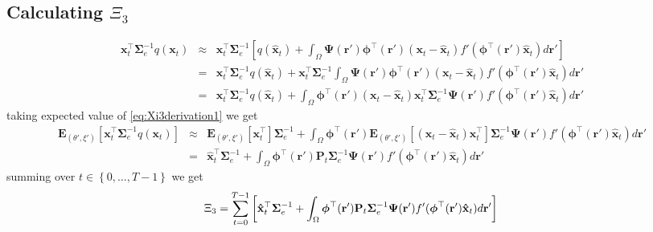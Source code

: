 \documentclass[]{article}
\begin{document}
\subsection*{Calculating $\Xi_3$}
\begin{eqnarray}\label{eq:Xi3derivation1}
 \mathbf x_t^\top\boldsymbol\Sigma_e^{-1}q(\mathbf x_t)&\approx&\mathbf x_t^\top\boldsymbol\Sigma_e^{-1}\left[q(\mathbf {\hat x}_t)+\int_\Omega \boldsymbol{\Psi}(\mathbf{r}')\boldsymbol \phi^\top(\mathbf r') (\mathbf x_t - \mathbf  {\hat x}_t)f'(\boldsymbol \phi^\top(\mathbf r')\mathbf {\hat x}_t) d\mathbf{r}'\right] \nonumber\\
&=&\mathbf x_t^\top\boldsymbol\Sigma_e^{-1}q(\mathbf {\hat x}_t)+\mathbf x_t^\top\boldsymbol\Sigma_e^{-1}\int_\Omega \boldsymbol{\Psi}(\mathbf{r}')\boldsymbol \phi^\top(\mathbf r') (\mathbf x_t - \mathbf  {\hat x}_t)f'(\boldsymbol \phi^\top(\mathbf r')\mathbf {\hat x}_t) d\mathbf{r}' \nonumber \\
&=&\mathbf x_t^\top\boldsymbol\Sigma_e^{-1}q(\mathbf {\hat x}_t)+\int_\Omega \boldsymbol \phi^\top(\mathbf r') (\mathbf x_t - \mathbf  {\hat x}_t)\mathbf x_t^\top\boldsymbol\Sigma_e^{-1}\boldsymbol{\Psi}(\mathbf{r}')f'(\boldsymbol \phi^\top(\mathbf r')\mathbf {\hat x}_t) d\mathbf{r}'
\end{eqnarray}
taking expected value of \ref{eq:Xi3derivation1} we get
\begin{eqnarray}\label{eq:Xi3derivation2}
\mathbf E_{(\theta',\xi')}\left[\mathbf x_t^\top\boldsymbol\Sigma_e^{-1}q(\mathbf x_t)\right]&\approx&\mathbf E_{(\theta',\xi')}\left[\mathbf x_t^\top\right]\boldsymbol\Sigma_e^{-1}+\int_\Omega \boldsymbol \phi^\top(\mathbf r') \mathbf E_{(\theta',\xi')}\left[(\mathbf x_t - \mathbf  {\hat x}_t)\mathbf x_t^\top\right]\boldsymbol\Sigma_e^{-1}\boldsymbol{\Psi}(\mathbf{r}')f'(\boldsymbol \phi^\top(\mathbf r')\mathbf {\hat x}_t) d\mathbf{r}' \nonumber \\
&=&\mathbf{ \hat x}_t^\top\boldsymbol\Sigma_e^{-1}+\int_\Omega \boldsymbol \phi^\top(\mathbf r') \mathbf P_t\boldsymbol\Sigma_e^{-1}\boldsymbol{\Psi}(\mathbf{r}')f'(\boldsymbol \phi^\top(\mathbf r')\mathbf {\hat x}_t) d\mathbf{r}'
\end{eqnarray}
summing over $t \in \left\lbrace 0, \dots, T-1\right\rbrace $ we get
\begin{equation}
\Xi_3=\sum_{t=0}^{T-1}\left[\mathbf{ \hat x}_t^\top\boldsymbol\Sigma_e^{-1}+\int_\Omega \boldsymbol \phi^\top(\mathbf r') \mathbf P_t\boldsymbol\Sigma_e^{-1}\boldsymbol{\Psi}(\mathbf{r}')f'(\boldsymbol \phi^\top(\mathbf r')\mathbf {\hat x}_t) d\mathbf{r}' \right] \\	
\end{equation}
\end{document}
